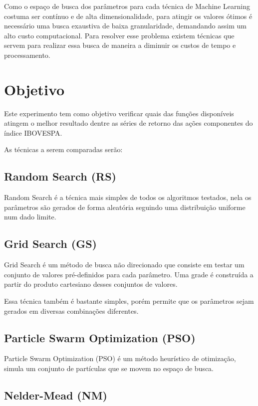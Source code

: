 \documentclass[preprint,12pt]{elsarticle}
\begin{document}
Como o espaço de busca dos parâmetros para cada técnica de Machine Learning costuma ser contínuo e de alta dimensionalidade, para atingir os valores ótimos é necessário uma busca exaustiva de baixa granularidade, demandando assim um alto custo computacional.
Para resolver esse problema existem técnicas que servem para realizar essa busca de maneira a diminuir os custos de tempo e processamento.

\section{Objetivo}

Este experimento tem como objetivo verificar quais das funções disponíveis atingem o melhor resultado dentre as séries de retorno das ações componentes do índice IBOVESPA.

As técnicas a serem comparadas serão:

\subsection{Random Search (RS)}

Random Search é a técnica mais simples de todos os algoritmos testados, nela os parâmetros são gerados de forma aleatória seguindo uma distribuição uniforme num dado limite.

\subsection{Grid Search (GS)}

Grid Search é um método de busca não direcionado que consiste em testar um conjunto de valores pré-definidos para cada parâmetro. Uma grade é construída a partir do produto cartesiano desses conjuntos de valores.

Essa técnica também é bastante simples, porém permite que os parâmetros sejam gerados em diversas combinações diferentes.

\subsection{Particle Swarm Optimization (PSO)}

Particle Swarm Optimization \cite{Kennedy:2010} \cite{Clerc2002} (PSO) é um método heurístico de otimização, simula um conjunto de partículas que se movem no espaço de busca.

\subsection{Nelder-Mead (NM)}
\end{document}

